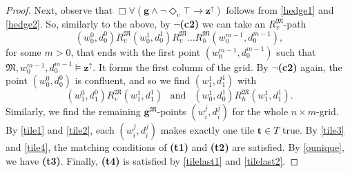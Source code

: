 \documentclass{lmcs} %
\theoremstyle{plain}\newtheorem{satz}[thm]{Satz} %
\newcommand{\tiling}{\mathfrak T}
\newcommand{\bbvarup}{\Zvar^\uparrow}
\newcommand{\bbvarright}{\Zvar^\to}
\newcommand{\Dvt}[1]{\Diamond_v{#1}}
\newcommand{\fform}[1]{\boldsymbol{#1}}
\newcommand{\gvar}{\fform{g}}
\newcommand{\tvar}{\fform{t}}
\newcommand{\Zvar}{\fform{z}}
\newcommand{\Bv}{\forall}
\newcommand{\Bh}{\Box}
\begin{document}
\begin{proof}
	Next, observe that $\Bh\Bv (\gvar \wedge \neg \Dvt{\top} \rightarrow \bbvarup)$ follows from 
	\eqref{hedge1} and \eqref{hedge2}.
	So, similarly to the above, by $\neg$\textbf{(c2)} 
	we can take an $R_{v}^\mathfrak M$-path
	$$
	(w_0^0,d_0^0) R_{v}^\mathfrak M (w_0^1,d_0^1) R_{v}^\mathfrak M \dots R_{h}^\mathfrak M (w_0^{m-1},d_0^{m-1}),
	$$
	for some $m>0$, that ends with the first point $(w^{m-1}_0,d^{m-1}_0)$ such that 
	$\mathfrak M,w^{m-1}_0,d^{m-1}_0 \models \bbvarup$. It forms the first column of the grid. 
	By $\neg$\textbf{(c2)} again, the point $(w_0^0,d_0^0)$ is confluent, and so we find $(w_1^1,d_1^1)$ with
	$$
	(w_1^0,d_1^0) R_{v}^\mathfrak M (w_1^1,d_1^1) \ \ \text{ and } \ \ (w^1_0,d^1_0) R_{h}^\mathfrak M (w_1^1,d_1^1).
	$$
	Similarly, we find the remaining $\gvar^\mathfrak M$-points $(w_i^j,d_i^j)$ for the whole $n\times m$-grid.
	By \eqref{tile1} and \eqref{tile2},
	each $(w_i^j,d_i^j)$ makes exactly one tile $\tvar\in T$ true.
	By \eqref{tile3} and \eqref{tile4}, the matching conditions of 
	\textbf{(t1)} and \textbf{(t2)} are satisfied. By \eqref{ounique}, we have \textbf{(t3)}.
	Finally, \textbf{(t4)} is satisfied by \eqref{tilelast1} and \eqref{tilelast2}.
\end{proof}
\end{document}
